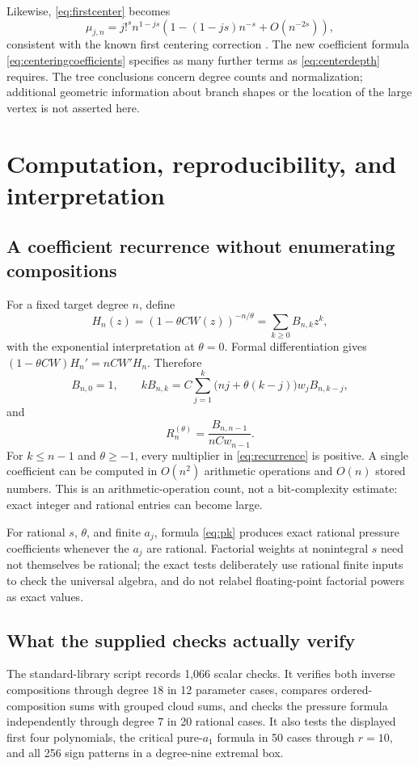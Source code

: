 \documentclass[11pt,a4paper]{article}
\theoremstyle{definition}
\theoremstyle{remark}
\numberwithin{equation}{section}
\begin{document}
Likewise, \eqref{eq:firstcenter} becomes
\[
 \mu_{j,n}=j!^s n^{1-js}
       \left(1-(1-js)n^{-s}+O(n^{-2s})\right),
\]
consistent with the known first centering correction
\cite[Theorem~2.6]{jjs}. The new coefficient formula
\eqref{eq:centeringcoefficients} specifies as many further terms as
\eqref{eq:centerdepth} requires. The tree conclusions concern degree
counts and normalization; additional geometric information about branch
shapes or the location of the large vertex is not asserted here.

\section{Computation, reproducibility, and interpretation}\label{sec:computation}

\subsection{A coefficient recurrence without enumerating compositions}
For a fixed target degree $n$, define
\begin{equation}
 H_n(z)=(1-\theta CW(z))^{-n/\theta}
        =\sum_{k\ge0}B_{n,k}z^k,
 \label{eq:Hn}
\end{equation}
with the exponential interpretation at $\theta=0$.
Formal differentiation gives
$(1-\theta CW)H_n'=nCW'H_n$. Therefore
\begin{equation}
 B_{n,0}=1,\qquad
 kB_{n,k}=C\sum_{j=1}^k
       \bigl(nj+\theta(k-j)\bigr)w_jB_{n,k-j},
 \label{eq:recurrence}
\end{equation}
and
\begin{equation}
 R_n^{(\theta)}=\frac{B_{n,n-1}}{nCw_{n-1}}.
 \label{eq:recurrenceR}
\end{equation}
For $k\le n-1$ and $\theta\ge-1$, every multiplier in
\eqref{eq:recurrence} is positive. A single coefficient can be
computed in $O(n^2)$ arithmetic operations and $O(n)$ stored numbers.
This is an arithmetic-operation count, not a bit-complexity estimate:
exact integer and rational entries can become large.

For rational $s$, $\theta$, and finite $a_j$, formula \eqref{eq:pk}
produces exact rational pressure coefficients whenever the $a_j$
are rational. Factorial weights at nonintegral $s$ need not themselves
be rational; the exact tests deliberately use rational finite inputs
to check the universal algebra, and do not relabel floating-point
factorial powers as exact values.

\subsection{What the supplied checks actually verify}
The standard-library script  records 1,066 scalar
checks. It verifies both inverse compositions through degree $18$ in
12 parameter cases, compares ordered-composition sums with grouped
cloud sums, and checks the pressure formula independently through
degree $7$ in 20 rational cases. It also tests the displayed first four
polynomials, the critical pure-$a_1$ formula in 50 cases through
$r=10$, and all 256 sign patterns in a degree-nine extremal box.
\end{document}
